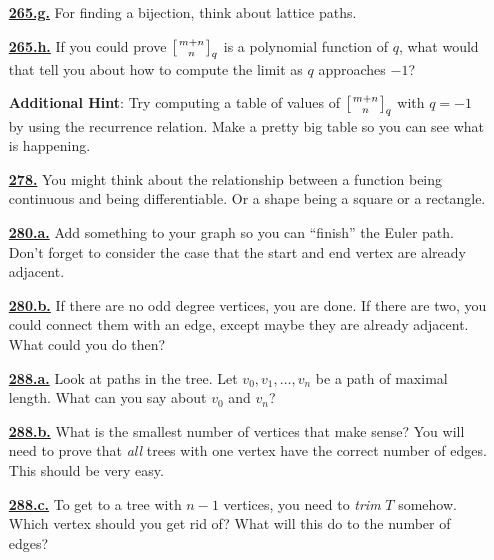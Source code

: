 \documentclass[10pt,]{book}
\theoremstyle{plain}
\theoremstyle{definition}
\theoremstyle{definition}
\theoremstyle{definition}
\numberwithin{equation}{chapter}
\newcommand{\qchoose}[2]{\left[{#1\atop#2}\right]_q}
\begin{document}
\begin{itemize}[itemsep=1em]
\hypertarget{a-265.g}{}\item[\textbf{\hyperref[task-219]{265.g.}}]
\hypertarget{p-1235}{}%
For finding a bijection, think about lattice paths.%

\hypertarget{a-265.h}{}\item[\textbf{\hyperref[task-220]{265.h.}}]
\hypertarget{p-1238}{}%
If you could prove \(\qchoose{m+n}{n}\) is a polynomial function of \(q\), what would that tell you about how to compute the limit as \(q\) approaches \(-1\)?%

\par\smallskip
\noindent\textbf{Additional Hint}: \hypertarget{p-1239}{}%
Try computing a table of values of \(\qchoose{m+n}{n}\) with \(q=-1\) by using the recurrence relation. Make a pretty big table so you can see what is happening.%

\hypertarget{a-278}{}\item[\textbf{\hyperref[activity-273]{278.}}]
\hypertarget{p-1402}{}%
You might think about the relationship between a function being continuous and being differentiable.  Or a shape being a square or a rectangle.%

\hypertarget{a-280.a}{}\item[\textbf{\hyperref[task-233]{280.a.}}]
\hypertarget{p-1415}{}%
Add something to your graph so you can ``finish'' the Euler path.  Don't forget to consider the case that the start and end vertex are already adjacent.%

\hypertarget{a-280.b}{}\item[\textbf{\hyperref[task-234]{280.b.}}]
\hypertarget{p-1420}{}%
If there are no odd degree vertices, you are done.  If there are two, you could connect them with an edge, except maybe they are already adjacent.  What could you do then?%

\hypertarget{a-288.a}{}\item[\textbf{\hyperref[task-248]{288.a.}}]
\hypertarget{p-1491}{}%
Look at paths in the tree.  Let \(v_0, v_1, \ldots, v_n\) be a path of maximal length.  What can you say about \(v_0\) and \(v_n\)?%

\hypertarget{a-288.b}{}\item[\textbf{\hyperref[task-249]{288.b.}}]
\hypertarget{p-1493}{}%
What is the smallest number of vertices that make sense?  You will need to prove that \emph{all} trees with one vertex have the correct number of edges.  This should be very easy.%

\hypertarget{a-288.c}{}\item[\textbf{\hyperref[task-250]{288.c.}}]
\hypertarget{p-1495}{}%
To get to a tree with \(n-1\) vertices, you need to \emph{trim} \(T\) somehow.  Which vertex should you get rid of?  What will this do to the number of edges?%


\end{itemize}
\end{document}
